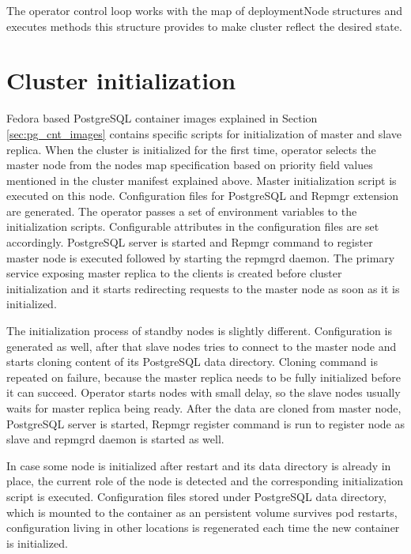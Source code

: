 \documentclass[
  digital, %
  twoside, %
  table,   %
  lof,     %
  lot,     %
]{fithesis3}
\begin{document}
 The operator control loop works with the map of deploymentNode structures and executes methods this structure provides to make cluster reflect the desired state.

\section{Cluster initialization}
Fedora based PostgreSQL container images explained in Section \ref{sec:pg_cnt_images} contains specific scripts for initialization of master and slave replica. When the cluster is initialized for the first time, operator selects the master node from the nodes map specification based on priority field values mentioned in the cluster manifest explained above. Master initialization script is executed on this node. Configuration files for PostgreSQL and Repmgr extension are generated. The operator passes a set of environment variables to the initialization scripts. Configurable attributes in the configuration files are set accordingly. PostgreSQL server is started and Repmgr command to register master node is executed followed by starting the repmgrd daemon. The primary service exposing master replica to the clients is created before cluster initialization and it starts redirecting requests to the master node as soon as it is initialized.

The initialization process of standby nodes is slightly different. Configuration is generated as well, after that slave nodes tries to connect to the master node and starts cloning content of its PostgreSQL data directory. Cloning command is repeated on failure, because the master replica needs to be fully initialized before it can succeed. Operator starts nodes with small delay, so the slave nodes usually waits for master replica being ready. After the data are cloned from master node, PostgreSQL server is started, Repmgr register command is run to register node as slave and repmgrd daemon is started as well.

In case some node is initialized after restart and its data directory is already in place, the current role of the node is detected and the corresponding initialization script is executed. Configuration files stored under PostgreSQL data directory, which is mounted to the container as an persistent volume survives pod restarts, configuration living in other locations is regenerated each time the new container is initialized.
\end{document}
